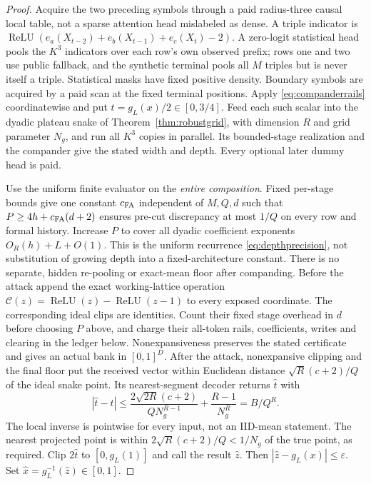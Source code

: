 \documentclass[11pt,letterpaper]{article}
\theoremstyle{definition}\newtheorem{definition}[theorem]{Definition}
\theoremstyle{remark}\newtheorem{remark}[theorem]{Remark}
\begin{document}
\begin{proof}
Acquire the two preceding symbols through a paid radius-three causal local table, not a sparse attention head mislabeled as dense. A triple indicator is
$\operatorname{ReLU}(e_a(X_{t-2})+e_b(X_{t-1})+e_c(X_t)-2)$.
A zero-logit statistical head pools the $K^3$ indicators over each row's own observed prefix; rows one and two use public fallback, and the synthetic terminal pools all $M$ triples but is never itself a triple. Statistical masks have fixed positive density. Boundary symbols are acquired by a paid scan at the fixed terminal positions. Apply \eqref{eq:companderrails} coordinatewise and put $t=g_L(x)/2\in[0,3/4]$. Feed each such scalar into the dyadic plateau snake of Theorem~\ref{thm:robustgrid}, with dimension $R$ and grid parameter $N_g$, and run all $K^3$ copies in parallel. Its bounded-stage realization and the compander give the stated width and depth. Every optional later dummy head is paid.

Use the uniform finite evaluator on the \emph{entire composition}. Fixed per-stage bounds give one constant $c_{\rm FA}$ independent of $M,Q,d$ such that
$P\ge4h+c_{\rm FA}(d+2)$ ensures pre-cut discrepancy at most $1/Q$ on every row and formal history. Increase $P$ to cover all dyadic coefficient exponents $O_R(h)+L+O(1)$. This is the uniform recurrence \eqref{eq:depthprecision}, not substitution of growing depth into a fixed-architecture constant. There is no separate, hidden re-pooling or exact-mean floor after companding. Before the attack append the exact working-lattice operation $\mathcal C(z)=\operatorname{ReLU}(z)-\operatorname{ReLU}(z-1)$ to every exposed coordinate. The corresponding ideal clips are identities. Count their fixed stage overhead in $d$ before choosing $P$ above, and charge their all-token rails, coefficients, writes and clearing in the ledger below. Nonexpansiveness preserves the stated certificate and gives an actual bank in $[0,1]^D$.
After the attack, nonexpansive clipping and the final floor put the received vector within Euclidean distance $\sqrt R(c+2)/Q$ of the ideal snake point. Its nearest-segment decoder returns $\widehat t$ with
\[
 |\widehat t-t|\le
 \frac{2\sqrt{2R}(c+2)}{QN_g^{R-1}}+\frac{R-1}{N_g^R}
 =B/Q^R.
\]
The local inverse is pointwise for every input, not an IID-mean statement. The nearest projected point is within $2\sqrt R(c+2)/Q<1/N_g$ of the true point, as required. Clip $2\widehat t$ to $[0,g_L(1)]$ and call the result $\widehat z$. Then
$|\widehat z-g_L(x)|\le\varepsilon$. Set $\widehat x=g_L^{-1}(\widehat z)\in[0,1]$.


\end{proof}
\end{document}
